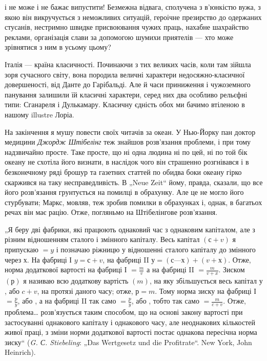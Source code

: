 \parcont{}  %
і не може і не бажає випустити! Безмежна відвага, сполучена
з в’юнкістю вужа, з якою він викручується з неможливих ситуацій,
героічне презирство до одержаних стусанів, нестримно швидке
присвоювання чужих праць, нахабне шахрайство реклами, організація
слави за допомогою шумихи приятелів — хто може зрівнятися
з ним в усьому цьому?

Італія — країна класичності. Починаючи з тих великих часів,
коли там зійшла зоря сучасного світу, вона породила величні
характери недосяжно-класичної довершеності, від Данте до
Гарібальді. Але й часи приниження і чужоземного панування
залишили їй класичні характери, серед них два особливо рельєфні
типи: Сганареля і Дулькамару. Класичну єдність обох ми
бачимо втіленою в нашому illustre Лоріа.

На закінчення я мушу повести своїх читачів за океан. У Нью-Йорку
пан доктор медицини \emph{Джордж Штібелінг} теж знайшов
розв’язання проблеми, і при тому надзвичайно просте. Таке
просте, що ні одна людина ні по цей, ні по той бік океану не
схотіла його визнати, в наслідок чого він страшенно розгнівався
і в безконечному ряді брошур та газетних статтей по обидва
боки океану гірко скаржився на таку несправедливість. В „Neue
Zeit“ йому, правда, сказали, що все його розв’язання грунтується
на помилці в обрахунку. Але це не могло його стурбувати;
Маркс, мовляв, теж зробив помилки в обрахунках і, однак,
в багатьох речах він має рацію. Отже, погляньмо на Штібелінгове
розв’язання.

„Я беру дві фабрики, які працюють однаковий час з однаковим
капіталом, але з різним відношенням сталого і змінного
капіталу. Весь капітал $(с + v)$ я припускаю $= y$ і позначаю ріжницю
у відношенні сталого капіталу до змінного через $х$. На
фабриці І $y = с + v$, на фабриці II $у = (с — х) + (v + х)$. Отже,
норма додаткової вартості на фабриці І $= \frac{m}{v}$ а на фабриці II $=
\frac{m}{v+x}$. Зиском $(р)$ я називаю всю додаткову вартість $(m)$, на
яку збільшується весь капітал $у$, або $c + v$, на протязі даного
часу; отже, $р = m$. Тому норма зиску на фабриці І $= \frac{p}{y}$, або
, а на фабриці II так само $= \frac{p}{y}$, або , тобто
так само $= \frac{m}{c + v}$. Отже, проблема\dots{} розв’язується таким способом,
що на основі закону вартості при застосуванні однакового
капіталу і однакового часу, але неоднакових кількостей
живої праці, з зміни норми додаткової вартості постає однакова
пересічна норма зиску“ (\emph{G. С. Stiebeling}: „Das Wertgesetz und die
Profitrate“. New York, John Heinrich).
